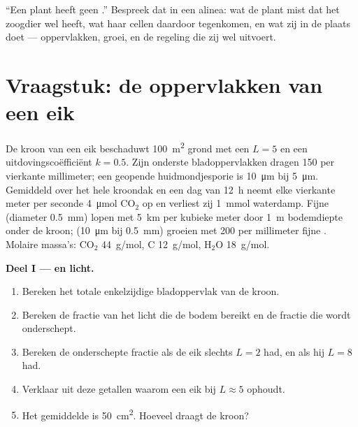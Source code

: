 \begin{exercise}[$\star\star\star$]\label{exo:b1:flowering-plant-organization:12}
``Een plant heeft geen .'' Bespreek dat in een alinea: wat de plant
mist dat het zoogdier wel heeft, wat haar cellen daardoor tegenkomen, en wat zij
in de plaats doet --- oppervlakken, groei, en de regeling die zij wel uitvoert.
\end{exercise}

\section{Vraagstuk: de oppervlakken van een eik}

\begin{problem}
\label{pb:b1:flowering-plant-organization:1}
De kroon van een eik beschaduwt \qty{100}{m^2} grond met een
 $L = 5$ en een uitdovingscoëfficiënt $k = 0.5$. Zijn
onderste bladoppervlakken dragen \qty{150}{}  per vierkante
millimeter; een geopende huidmondjesporie is \qty{10}{\micro m} bij
\qty{5}{\micro m}. Gemiddeld over het hele kroondak en een dag van \qty{12}{h}
neemt elke vierkante meter  per seconde \qty{4}{\micro mol}
$\mathrm{CO_2}$ op en verliest zij \qty{1}{mmol} waterdamp. Fijne 
(diameter \qty{0.5}{mm}) lopen met \qty{5}{km} per kubieke meter door
\qty{1}{m} bodemdiepte onder de kroon;  (\qty{10}{\micro m} bij
\qty{0.5}{mm}) groeien met \qty{200}{} per millimeter fijne . Molaire
massa's: $\mathrm{CO_2}$ \qty{44}{g/mol}, C \qty{12}{g/mol},
$\mathrm{H_2O}$ \qty{18}{g/mol}.

\medskip
\noindent\textbf{Deel I ---  en licht.}
\begin{enumerate}
  \item Bereken het totale enkelzijdige bladoppervlak van de kroon.
  \item Bereken de fractie van het licht die de bodem bereikt en de
        fractie die wordt onderschept.
  \item Bereken de onderschepte fractie als de eik slechts $L = 2$ had,
        en als hij $L = 8$ had.
  \item Verklaar uit deze getallen waarom een eik bij $L \approx 5$ ophoudt.
  \item Het gemiddelde  is \qty{50}{cm^2}. Hoeveel  draagt de
        kroon?
\end{enumerate}


\end{problem}
